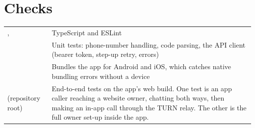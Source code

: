 \section{Checks}

\begin{tabularx}{\linewidth}{@{}L{6.2cm}Y@{}}
\toprule
{} &  \\
\midrule
{},  & TypeScript and ESLint \\
 & Unit tests: phone-number handling, code parsing, the API client (bearer token, step-up retry, errors) \\
 & Bundles the app for Android and iOS, which catches native bundling errors without a device \\
 (repository root) & End-to-end tests on the app's web build. One test is an app caller reaching a website owner, chatting both ways, then making an in-app call through the TURN relay. The other is the full owner set-up inside the app. \\
\bottomrule
\end{tabularx}
